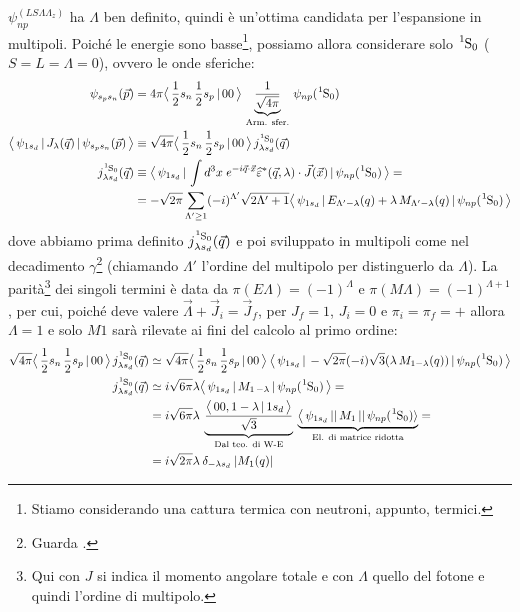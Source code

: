 $\psi_{np}^{(LS\Lambda\Lambda_z)}$ ha $\Lambda$ ben definito, quindi è un'ottima candidata per l'espansione in multipoli. Poiché le energie sono basse\footnote{Stiamo considerando una cattura termica con neutroni, appunto, termici.}, possiamo allora considerare solo $\ce{^1S_0}$ ($S=L=\Lambda = 0$), ovvero le onde sferiche:
\begin{displaymath}
\begin{aligned}
\psi_{s_p s_n}(\vec{p}) &= 4\pi \clebs{\frac{1}{2}s_n\,\frac{1}{2}s_p}{00}\, \underbrace{\frac{1}{\sqrt{4\pi}}}_\text{Arm. sfer.} \, \psi_{np}(\ce{^1S_0}) \\
%
\oss{\psi_{1s_d}}{J_\lambda(\vec{q})}{\psi_{s_p s_n}(\vec{p})} &\equiv \sqrt{4\pi} \clebs{\frac{1}{2}s_n\,\frac{1}{2}s_p}{00}\, j^{\ce{^1S_0}}_{\lambda s_d} (\vec{q}) \\
j^{\ce{^1S_0}}_{\lambda s_d} (\vec{q}) &\equiv \oss{\psi_{1s_d}}{\int d^3x \; e^{-i\vec{q}\cdot\vec{x}}\widehat{\varepsilon}^*(\vec{q},\lambda) \cdot \vec{J}(\vec{x})}{\psi_{np}(\ce{^1S_0})} = \\
&= -\sqrt{2\pi} \sum_{\Lambda'\geq 1} (-i)^{\Lambda'} \sqrt{2\Lambda' +1} \oss{\psi_{1s_d}}{E_{\Lambda'-\lambda}(q)  + \lambda \, M_{\Lambda'-\lambda}(q)}{\psi_{np}(\ce{^1S_0})}
\end{aligned}
\end{displaymath}
dove abbiamo prima definito $j^{\ce{^1S_0}}_{\lambda s_d} (\vec{q})$ e poi sviluppato in multipoli come nel decadimento $\gamma$\footnote{Guarda .} (chiamando $\Lambda'$ l'ordine del multipolo per distinguerlo da $\Lambda$).
La parità\footnote{Qui con $J$ si indica il momento angolare totale e con $\Lambda$ quello del fotone e quindi l'ordine di multipolo.} dei singoli termini è data da $\pi(E\Lambda)=(-1)^\Lambda$ e $\pi(M\Lambda)=(-1)^{\Lambda+1}$, per cui, poiché deve valere $\vec{\Lambda}+\vec{J}_i = \vec{J}_f$, per $J_f = 1$, $J_i = 0$ e $\pi_i=\pi_f=+$ allora $\Lambda = 1$ e solo $M1$ sarà rilevate ai fini del calcolo al primo ordine:
\begin{displaymath}
\begin{aligned}
\sqrt{4\pi} \clebs{\frac{1}{2}s_n\,\frac{1}{2}s_p}{00}\, j^{\ce{^1S_0}}_{\lambda s_d} (\vec{q}) &\simeq \sqrt{4\pi} \clebs{\frac{1}{2}s_n\,\frac{1}{2}s_p}{00}\: \oss{\psi_{1s_d}}{-\sqrt{2\pi}(-i) \sqrt{3} (\lambda\,M_{1-\lambda}(q))}{\psi_{np}(\ce{^1S_0})}\\
j^{\ce{^1S_0}}_{\lambda s_d} (\vec{q})&\simeq i\sqrt{6\pi} \lambda \oss{\psi_{1s_d}}{M_{1\,-\lambda}}{\psi_{np}(\ce{^1S_0})} =\\
&= i \sqrt{6\pi} \lambda \:\underbrace{ \frac{\clebs{00,1-\lambda}{1s_d}}{\sqrt{3}}}_\text{Dal teo. di W-E} \: \underbrace{\bigl \langle \, \psi_{1s_d}\,||\,M_1\,||\,\psi_{np}(\ce{^1S_0})\rangle}_\text{El. di matrice ridotta} = \\
&= i \sqrt{2\pi} \lambda \: \delta_{-\lambda s_d} \: |M_1(q)|
\end{aligned}
\end{displaymath}

